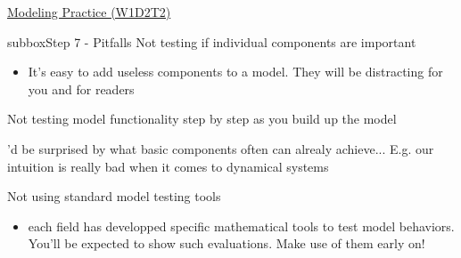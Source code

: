 \begin{textbox}{\href{https://compneuro.neuromatch.io/tutorials/W1D2_ModelingPractice/W1D2_Intro.html}{Modeling Practice  (W1D2T2)} }
\begin{subbox}{subbox}{Step 7 - Pitfalls }
Not testing if individual components are important
  \begin{itemize}
    \item It's easy to add useless components to a model. They will be distracting for you and for readers\end{itemize}


Not testing model functionality step by step as you  build up the model
  \begin{itemize}
    \itemYou'd be surprised by what basic components often can alrealy achieve... E.g. our intuition is really bad when it comes to dynamical systems\end{itemize}


Not using standard model testing tools
  \begin{itemize}
    \item each field has developped specific mathematical tools to test model behaviors. You'll be expected to show such evaluations. Make use of them early on!\end{itemize}


\end{subbox}
 
 
\end{textbox}
